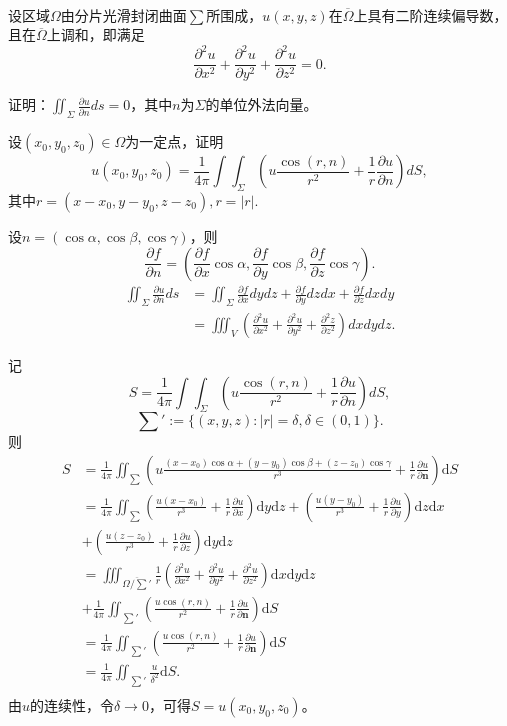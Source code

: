   \begin{exercise}
  \hfill\\
设区域$\Omega$由分片光滑封闭曲面$\sum$所围成，$u(x,y,z)$在$\overline{\Omega}$上具有二阶连续偏导数，且在$\overline{\Omega}$上调和，即满足
$$\frac{\partial^2u}{\partial x^2}+\frac{\partial^2u}{\partial y^2}+\frac{\partial^2u}{\partial z^2}=0.$$  
  
  证明：$\iint_{\Sigma}\frac{\partial u}{\partial n}ds=0$，其中$n$为$\Sigma$的单位外法向量。
  
  设$(x_0,y_0,z_0)\in\Omega$为一定点，证明
  $$u(x_0,y_0,z_0)=\frac1{4\pi}\int\int_{\Sigma}(u\frac{\cos(r,n)}{r^2}+\frac1r\frac{\partial u}{\partial n})dS,$$
  其中$r=(x-x_0,y-y_0,z-z_0),r=|r|.$  
  
   设$n=(\cos\alpha,\cos\beta,\cos\gamma)$，则
  $$\frac{\partial f}{\partial n}=(\frac{\partial f}{\partial x}\cos\alpha,\frac{\partial f}{\partial y}\cos\beta,\frac{\partial f}{\partial z}\cos\gamma).$$
  \begin{align*}
    \iint_{\Sigma}\frac{\partial u}{\partial n}ds&=\iint_{\Sigma}\frac{\partial f}{\partial x}dydz+\frac{\partial f}{\partial y}dzdx+\frac{\partial f}{\partial z}dxdy\\
    &=\iiint_V(\frac{\partial^2u}{\partial x^2}+\frac{\partial^2u}{\partial y^2}+\frac{\partial^2z}{\partial z^2})dxdydz.
  \end{align*} 
  
  记
$$S=\frac1{4\pi}\int\int_{\Sigma}(u\frac{\cos(r,n)}{r^2}+\frac1r\frac{\partial u}{\partial n})dS,$$
$$\sum':=\{(x,y,z):|r|=\delta,\delta\in(0,1)\}.$$
则
\begin{align*}
S&=\frac{1}{4\pi}\iint_{\sum}(u\frac{(x-x_0)\cos\alpha+(y-y_0)\cos\beta+(z-z_0)\cos\gamma}{r^3}+\frac{1}{r}\frac{\partial u}{\partial \textbf{n}})\mathrm{d}S\\
&=\frac{1}{4\pi}\iint_{\sum}(\frac{u(x-x_0)}{r^3}+\frac{1}{r}\frac{\partial u}{\partial x})\mathrm{d}y\mathrm{d}z
+(\frac{u(y-y_0)}{r^3}+\frac{1}{r}\frac{\partial u}{\partial y})\mathrm{d}z\mathrm{d}x\\
&+(\frac{u(z-z_0)}{r^3}+\frac{1}{r}\frac{\partial u}{\partial z})\mathrm{d}y\mathrm{d}z\\
&=\iiint_{\overline{\Omega/\sum'}}\frac{1}{r}(\frac{\partial^2u}{\partial x^2}+\frac{\partial^2u}{\partial y^2}+\frac{\partial^2u}{\partial z^2})\mathrm{d}x\mathrm{d}y\mathrm{d}z\\
&+\frac{1}{4\pi}\iint_{\sum'}(\frac{u\cos(r,n)}{r^2}+\frac{1}{r}\frac{\partial u}{\partial\textbf{n}})\mathrm{d}S\\
&=\frac{1}{4\pi}\iint_{\sum'}(\frac{u\cos(r,n)}{r^2}+\frac{1}{r}\frac{\partial u}{\partial\textbf{n}})\mathrm{d}S\\
&=\frac{1}{4\pi}\iint_{\sum'}\frac{u}{\delta^2}\mathrm{d}S.\\
\end{align*}
由$u$的连续性，令$\delta\rightarrow0$，可得$S=u(x_0,y_0,z_0)$。
  \end{exercise}
 \hfill\\
 
